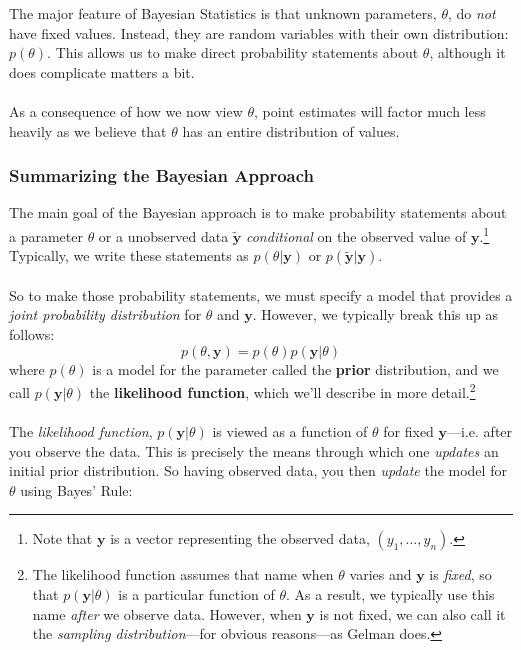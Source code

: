 \documentclass[12pt]{article}
\theoremstyle{plain}
\theoremstyle{definition}
\theoremstyle{remark}
\begin{document}
The major feature of Bayesian Statistics is that unknown parameters,
$\theta$, do \emph{not} have fixed values. Instead, they are random
variables with their own distribution: $p(\theta)$. This allows us
to make direct probability statements about $\theta$, although it
does complicate matters a bit.
\\
\\
As a consequence of how we now view $\theta$, point estimates will
factor much less heavily as we believe that $\theta$ has an entire
distribution of values.

\subsubsection{Summarizing the Bayesian Approach}

The main goal of the Bayesian approach is to make probability statements
about a parameter $\theta$ or a unobserved data $\tilde{\mathbf{y}}$
\emph{conditional} on the observed value of $\mathbf{y}$.\footnote{Note
that $\mathbf{y}$ is a vector representing the observed
data, $(y_1, \ldots, y_n)$.} Typically, we write these statements
as $p(\theta| \mathbf{y})$ or  $p(\tilde{\mathbf{y}}| \mathbf{y})$.
\\
\\
So to make those probability statements, we must specify a model that
provides a \emph{joint probability distribution} for $\theta$ and
$\mathbf{y}$. However, we typically break this up as follows:
   \[ p(\theta, \textbf{y}) = p(\theta) p(\mathbf{y} | \theta) \]
where $p(\theta)$ is a model for the parameter called the \textbf{prior}
distribution, and we call $p(\mathbf{y} | \theta)$ the \textbf{likelihood
function}, which we'll describe in more detail.\footnote{The
   likelihood function assumes that name when $\theta$ varies and
   $\textbf{y}$ is \emph{fixed}, so that $p(\mathbf{y} | \theta)$ is
   a particular function of $\theta$.  As a result, we typically use
   this name \emph{after} we observe data.  However,
   when $\mathbf{y}$ is not fixed, we can also call it the
   \emph{sampling distribution}---for obvious reasons---as Gelman does.}
\\
\\
The \emph{likelihood function}, $p(\mathbf{y} | \theta)$ is viewed
as a function of $\theta$ for fixed $\mathbf{y}$---i.e. after you observe
the data.  This is precisely the means through which one \emph{updates}
an initial prior distribution. So having observed data,
you then \emph{update} the model for $\theta$ using Bayes' Rule:
\end{document}
